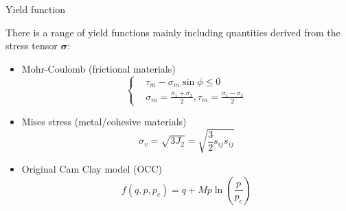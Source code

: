 \documentclass[aspectratio=169]{beamer}
\begin{document}
\begin{frame}{Yield function}
	\fontsize{8}{9}\selectfont 
    \begin{minipage}[c]{0.45\linewidth}
    	There is a range of yield functions mainly including quantities derived from the stress tensor $\boldsymbol{\sigma}$:
        \begin{itemize}
            \item Mohr-Coulomb (frictional materials)
            \vspace{-2mm}
            \begin{equation}
                \left\{\begin{aligned}
                    &\tau_m -\sigma_m \sin \phi \leq 0 \\ 
                    &\sigma_m=\frac{\sigma_1+\sigma_3}{2},\tau_m=\frac{\sigma_1-\sigma_3}{2}
                \end{aligned}\right.
                \label{eq: mohr-coulomb model}
            \end{equation}
            
            \item Mises stress (metal/cohesive  materials)
            \vspace{-2mm}
            \begin{equation}
                \sigma_v = \sqrt{3J_2}=\sqrt{\frac{3}{2}s_{ij}s_{ij}}
                \label{eq: vonmises stress}
            \end{equation}
            
            \item Original Cam Clay model (OCC)
            \vspace{-2mm}
            \begin{equation}
                f(q, p, p_c) = q + Mp\ln{(\frac{p}{p_c})}
                \label{eq: origincal cam clay model}
            \end{equation}
        

\end{itemize}
\end{minipage}
\end{frame}
\end{document}
